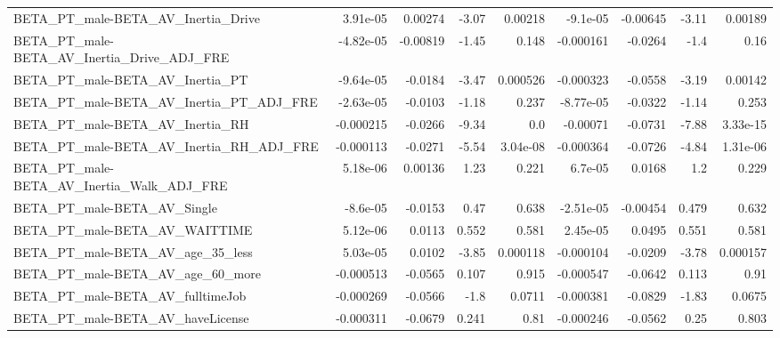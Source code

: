 \begin{tabular}{lrrrrrrrr}
BETA\_PT\_male-BETA\_AV\_Inertia\_Drive                 &    3.91e-05 &      0.00274 &    -3.07 &  0.00218 &   -9.1e-05 &    -0.00645 &        -3.11 &       0.00189 \\
BETA\_PT\_male-BETA\_AV\_Inertia\_Drive\_ADJ\_FRE         &   -4.82e-05 &     -0.00819 &    -1.45 &    0.148 &  -0.000161 &     -0.0264 &         -1.4 &          0.16 \\
BETA\_PT\_male-BETA\_AV\_Inertia\_PT                    &   -9.64e-05 &      -0.0184 &    -3.47 & 0.000526 &  -0.000323 &     -0.0558 &        -3.19 &       0.00142 \\
BETA\_PT\_male-BETA\_AV\_Inertia\_PT\_ADJ\_FRE            &   -2.63e-05 &      -0.0103 &    -1.18 &    0.237 &  -8.77e-05 &     -0.0322 &        -1.14 &         0.253 \\
BETA\_PT\_male-BETA\_AV\_Inertia\_RH                    &   -0.000215 &      -0.0266 &    -9.34 &      0.0 &   -0.00071 &     -0.0731 &        -7.88 &      3.33e-15 \\
BETA\_PT\_male-BETA\_AV\_Inertia\_RH\_ADJ\_FRE            &   -0.000113 &      -0.0271 &    -5.54 & 3.04e-08 &  -0.000364 &     -0.0726 &        -4.84 &      1.31e-06 \\
BETA\_PT\_male-BETA\_AV\_Inertia\_Walk\_ADJ\_FRE          &    5.18e-06 &      0.00136 &     1.23 &    0.221 &    6.7e-05 &      0.0168 &          1.2 &         0.229 \\
BETA\_PT\_male-BETA\_AV\_Single                        &    -8.6e-05 &      -0.0153 &     0.47 &    0.638 &  -2.51e-05 &    -0.00454 &        0.479 &         0.632 \\
BETA\_PT\_male-BETA\_AV\_WAITTIME                      &    5.12e-06 &       0.0113 &    0.552 &    0.581 &   2.45e-05 &      0.0495 &        0.551 &         0.581 \\
BETA\_PT\_male-BETA\_AV\_age\_35\_less                   &    5.03e-05 &       0.0102 &    -3.85 & 0.000118 &  -0.000104 &     -0.0209 &        -3.78 &      0.000157 \\
BETA\_PT\_male-BETA\_AV\_age\_60\_more                   &   -0.000513 &      -0.0565 &    0.107 &    0.915 &  -0.000547 &     -0.0642 &        0.113 &          0.91 \\
BETA\_PT\_male-BETA\_AV\_fulltimeJob                   &   -0.000269 &      -0.0566 &     -1.8 &   0.0711 &  -0.000381 &     -0.0829 &        -1.83 &        0.0675 \\
BETA\_PT\_male-BETA\_AV\_haveLicense                   &   -0.000311 &      -0.0679 &    0.241 &     0.81 &  -0.000246 &     -0.0562 &         0.25 &         0.803 \\

\end{tabular}
